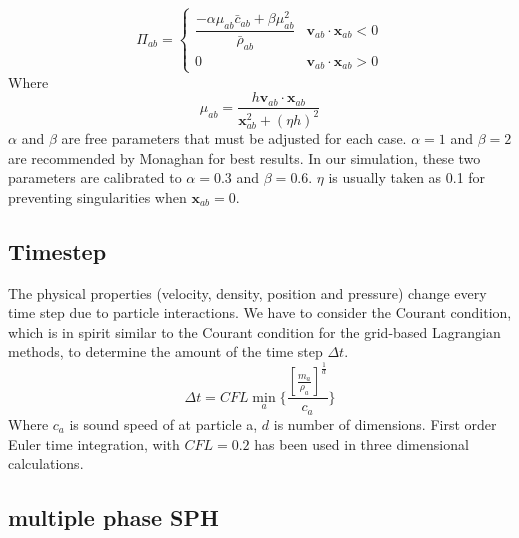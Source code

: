 \documentclass[10pt,a4paper]{article}
\begin{document}
\begin{equation}
\Pi_{ab} = 
\begin{cases} 
      \dfrac{- \alpha \mu_{ab} \bar{c}_{ab} + \beta \mu_{ab}^2} {\bar{\rho}_{ab}} & \textbf{v}_{ab} \cdot \textbf{x}_{ab} < 0\\
      0 & \textbf{v}_{ab} \cdot \textbf{x}_{ab} > 0
\end{cases}
\label{eq:art-vis-shock}
\end{equation}
Where
\begin{equation}
\mu_{ab} = \dfrac{h \textbf{v}_{ab} \cdot \textbf{x}_{ab}}{\textbf{x}_{ab}^2 + (\eta h)^2} 
\end{equation}
$\alpha$ and $\beta$ are free parameters that must be adjusted for each case. $\alpha = 1$ and $\beta = 2$ are  recommended by Monaghan for best results. In our simulation, these two parameters are calibrated to  $\alpha = 0.3$ and $\beta = 0.6$. $\eta$ is usually taken as 0.1 for preventing singularities when $\textbf{x}_{ab} = 0$.
\subsection{Timestep}
The physical properties (velocity, density, position and pressure) change every time step due to particle interactions. We have to consider the Courant condition, which is in spirit similar to the Courant condition for the grid-based Lagrangian methods, to determine the amount of the time step $\Delta t$.
\begin{equation}
\Delta t = CFL \min_a \bigg \lbrace \dfrac{[\frac{m_a}{\rho_a}]^{\frac{1}{d}}}{c_a} \bigg \rbrace
\end{equation}
Where $c_a$ is sound speed of at particle a, $d$ is number of dimensions. First order Euler time integration, with $CFL = 0.2$ has been used in three dimensional calculations.
\subsection{multiple phase SPH}
\end{document}
